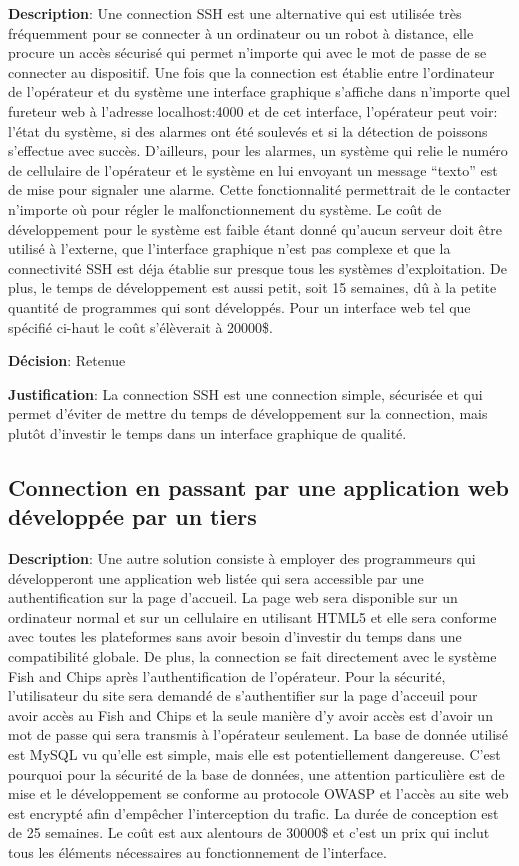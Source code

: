 \textbf{Description}:
Une connection SSH est une alternative qui est utilisée très fréquemment pour se connecter à un ordinateur ou un robot à distance, elle procure un accès sécurisé qui permet n’importe qui avec le mot de passe de se connecter au dispositif. Une fois que la connection est établie entre l’ordinateur de l’opérateur et du système une interface graphique s’affiche dans n’importe quel fureteur web à l’adresse localhost:4000 et de cet interface, l’opérateur peut voir: l’état du système, si des alarmes ont été soulevés et si la détection de poissons s’effectue avec succès. D’ailleurs, pour les alarmes, un système qui relie le numéro de cellulaire de l’opérateur et le système en lui envoyant un message “texto” est de mise pour signaler une alarme. Cette fonctionnalité permettrait de le contacter n’importe où pour régler le malfonctionnement du système. Le coût de développement pour le système est faible étant donné qu’aucun serveur doit être utilisé à l’externe, que l’interface graphique n’est pas complexe et que la connectivité SSH est déja établie sur presque tous les systèmes d’exploitation. De plus, le temps de développement est aussi petit, soit 15 semaines, dû à la petite quantité de programmes qui sont développés. Pour un interface web tel que spécifié ci-haut le coût s’élèverait à 20000\$.

\textbf{Décision}: Retenue

\textbf{Justification}: La connection SSH est une connection simple, sécurisée et qui permet d’éviter de mettre du temps de développement sur la connection, mais plutôt d’investir le temps dans un interface graphique de qualité.

\subsection {Connection en passant par une application web développée par un tiers}

\textbf{Description}: Une autre solution consiste à employer des programmeurs qui développeront une application web listée qui sera accessible par une authentification sur la page d'accueil. La page web sera disponible sur un ordinateur normal et sur un cellulaire en utilisant HTML5 et elle sera conforme avec toutes les plateformes sans avoir besoin d’investir du temps dans une compatibilité globale. De plus, la connection se fait directement avec le système Fish and Chips après l’authentification de l’opérateur. Pour la sécurité, l’utilisateur du site sera demandé de s’authentifier sur la page d’acceuil pour avoir accès au Fish and Chips et la seule manière d’y avoir accès est d’avoir un mot de passe qui sera transmis à l’opérateur seulement. La base de donnée utilisé est MySQL vu qu’elle est simple, mais elle est potentiellement dangereuse. C’est pourquoi pour la sécurité de la base de données, une attention particulière est de mise et le développement se conforme au protocole OWASP et l’accès au site web est encrypté afin d'empêcher l’interception du trafic. La durée de conception est de 25 semaines. Le coût est aux alentours de 30000\$ et c’est un prix qui inclut tous les éléments nécessaires au fonctionnement de l’interface.


